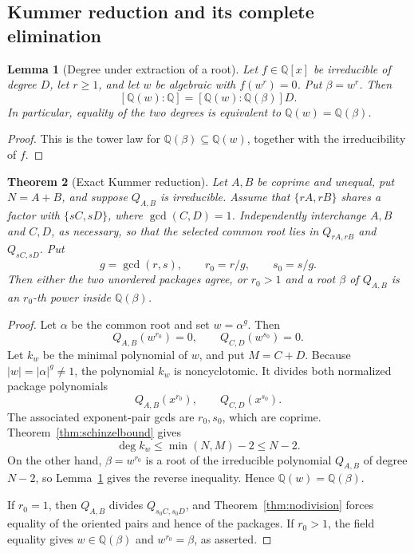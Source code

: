 \documentclass[11pt]{article}
\newtheorem{theorem}{Theorem}[section]
\newtheorem{lemma}[theorem]{Lemma}
\theoremstyle{definition}
\newcommand{\Q}{\mathbb Q}
\begin{document}
\subsection{Kummer reduction and its complete elimination}

\begin{lemma}[Degree under extraction of a root]
\label{lem:kummerdegree}
Let \(f\in\Q[x]\) be irreducible of degree \(D\), let \(r\geq1\), and let
\(w\) be algebraic with \(f(w^r)=0\).  Put \(\beta=w^r\).  Then
\[
 [\Q(w):\Q]=[\Q(w):\Q(\beta)]D.
\]
In particular, equality of the two degrees is equivalent to
\(\Q(w)=\Q(\beta)\).
\end{lemma}

\begin{proof}
This is the tower law for \(\Q(\beta)\subseteq\Q(w)\), together with the
irreducibility of \(f\).
\end{proof}

\begin{theorem}[Exact Kummer reduction]
\label{thm:kummerreduction}
Let \(A,B\) be coprime and unequal, put \(N=A+B\), and suppose
\(Q_{A,B}\) is irreducible.  Assume that \(\{rA,rB\}\) shares a factor
with \(\{sC,sD\}\), where \(\gcd(C,D)=1\).  Independently interchange \(A,B\) and \(C,D\), as necessary, so that the
selected common root lies in \(Q_{rA,rB}\) and \(Q_{sC,sD}\).  Put
\[
 g=\gcd(r,s),\qquad r_0=r/g,\qquad s_0=s/g.
\]
Then either the two unordered packages agree, or \(r_0>1\) and a root
\(\beta\) of \(Q_{A,B}\) is an \(r_0\)-th power inside \(\Q(\beta)\).
\end{theorem}

\begin{proof}
Let \(\alpha\) be the common root and set \(w=\alpha^g\).  Then
\[
 Q_{A,B}(w^{r_0})=0,
 \qquad Q_{C,D}(w^{s_0})=0.
\]
Let \(k_w\) be the minimal polynomial of \(w\), and put \(M=C+D\).
Because \(|w|=|\alpha|^g\neq1\), the polynomial \(k_w\) is noncyclotomic.
It divides both normalized package polynomials
\[
 Q_{A,B}(x^{r_0}),
 \qquad Q_{C,D}(x^{s_0}).
\]
The associated exponent-pair gcds are \(r_0,s_0\), which are coprime.
Theorem~\ref{thm:schinzelbound} gives
\[
 \deg k_w\leq\min(N,M)-2\leq N-2.
\]
On the other hand, \(\beta=w^{r_0}\) is a root of the irreducible polynomial
\(Q_{A,B}\) of degree \(N-2\), so Lemma~\ref{lem:kummerdegree} gives the
reverse inequality.  Hence \(\Q(w)=\Q(\beta)\).

If \(r_0=1\), then \(Q_{A,B}\) divides \(Q_{s_0C,s_0D}\), and
Theorem~\ref{thm:nodivision} forces equality of the oriented pairs and hence
of the packages.  If \(r_0>1\), the field equality gives
\(w\in\Q(\beta)\) and \(w^{r_0}=\beta\), as asserted.
\end{proof}
\end{document}
